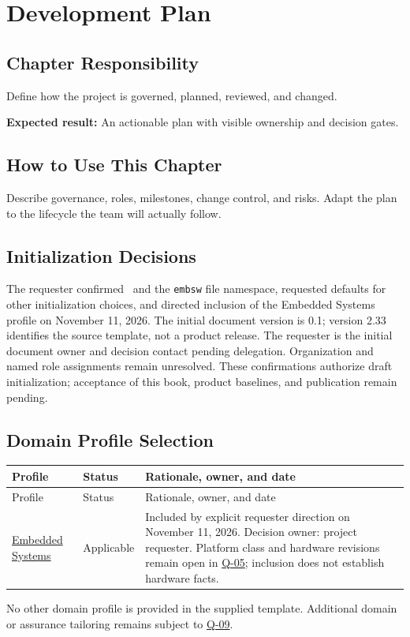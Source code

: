 \chapter{Development Plan}
\section{Chapter Responsibility}
\label{Section:DevelopmentPlanResponsibility}
Define how the project is governed, planned, reviewed, and changed.

\noindent\textbf{Expected result:} An actionable plan with visible ownership and decision gates.

\section{How to Use This Chapter}
Describe governance, roles, milestones, change control, and risks. Adapt the plan to the lifecycle the team will actually follow.

\section{Initialization Decisions}
\label{Section:InitializationDecisions}
The requester confirmed \ProjectName\ and the \texttt{embsw} file namespace,
requested defaults for other initialization choices, and directed inclusion of
the Embedded Systems profile on November 11, 2026. The initial document version
is 0.1; version 2.33 identifies the source template, not a product release.
The requester is the initial document owner and decision contact pending
delegation. Organization and named role assignments remain unresolved.
These confirmations authorize draft initialization; acceptance of this book,
product baselines, and publication remain pending.

\section{Domain Profile Selection}
\label{Section:DevelopmentPlanProfiles}
\begin{tabularx}{\linewidth}{L{3.1cm}L{2.3cm}Y}
\caption{Project Domain Profile Decisions\label{Table:ProjectDomainProfiles}}\\
\toprule Profile & Status & Rationale, owner, and date\\\midrule
\endfirsthead
\toprule Profile & Status & Rationale, owner, and date\\\midrule
\endhead
\hyperref[Chapter:EmbeddedSystemsProfile]{Embedded Systems} & Applicable &
Included by explicit requester direction on November 11, 2026. Decision owner:
project requester. Platform class and hardware revisions remain open in
\hyperref[Question:Q-05]{Q-05}; inclusion does not establish hardware facts.\\
\bottomrule\end{tabularx}
No other domain profile is provided in the supplied template. Additional
domain or assurance tailoring remains subject to \hyperref[Question:Q-09]{Q-09}.

